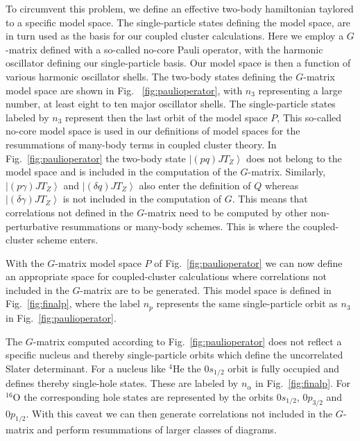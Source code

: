 \documentclass[fleqn,12pt,twoside]{article}
\begin{document}
To circumvent this problem, we define an effective two-body 
hamiltonian taylored to a specific
model space. The single-particle states 
defining the model space, are in turn used as the basis for our coupled cluster
calculations. Here we employ a $G$-matrix defined with a so-called no-core 
Pauli operator, with
the harmonic oscillator defining our single-particle basis. 
Our model space is then a function of
various harmonic oscillator shells. The two-body states defining the 
$G$-matrix model space are  shown in Fig.~ \ref{fig:paulioperator}, 
with $n_3$ representing a large number, at least eight to ten major
oscillator shells.   
The single-particle states labeled by $n_3$ 
represent then the last orbit of the model space $P$, 
This so-called no-core model space is used in our definitions of 
model spaces for the resummations of many-body terms in 
coupled cluster theory. 
In Fig.~\ref{fig:paulioperator} the two-body state
$\left| (pq)JT_Z\right \rangle$ 
does not belong to the model space and is included
in the computation of
the $G$-matrix.
Similarly,
$\left| (p\gamma)JT_Z\right \rangle$
and
$\left| (\delta q)JT_Z\right \rangle$
also enter the definition of $Q$ whereas
$\left| (\delta\gamma)JT_Z\right \rangle$
is not included in the computation of $G$.
This means that correlations not defined in the $G$-matrix need
to be computed by other non-perturbative
resummations or many-body schemes.
This is where the coupled-cluster scheme enters.

With the $G$-matrix model space $P$ of Fig.~\ref{fig:paulioperator} we can now define
an appropriate space for 
coupled-cluster calculations where correlations
not included in the $G$-matrix are to be generated. This model space is defined
in Fig.~\ref{fig:finalp}, where the label $n_{p}$ represents the same
single-particle orbit as $n_{3}$ in  Fig.~\ref{fig:paulioperator}.

The $G$-matrix computed according to Fig.~\ref{fig:paulioperator}
does not reflect a specific nucleus and
thereby single-particle orbits which define the uncorrelated
Slater determinant.  For a nucleus like
$^{4}$He the $0s_{1/2}$ orbit is fully occupied and defines thereby single-hole states.
These are labeled by $n_{\alpha}$ in Fig.~\ref{fig:finalp}.
For $^{16}$O the corresponding hole states are represented by the orbits
$0s_{1/2}$,  $0p_{3/2}$ and  $0p_{1/2}$. With this caveat we can then generate
correlations not included in the $G$-matrix and perform resummations of larger 
classes of diagrams.
\end{document}
